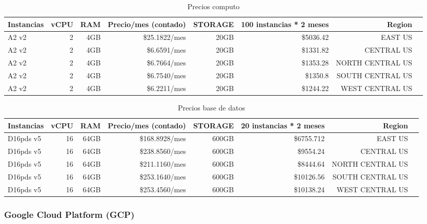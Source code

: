 \documentclass{article}
\begin{document}
  \begin{table}[!htp]\centering
\caption{Precios computo}\label{tab: }
\scriptsize
\begin{tabular}{lrrrrrrr}\toprule
Instancias &vCPU &RAM &Precio/mes (contado) &STORAGE &100 instancias * 2 meses &Region \\\midrule
A2 v2 &2 &4GB &\$25.1822/mes &20GB &\$5036.42 &EAST US \\
A2 v2 &2 &4GB &\$6.6591/mes &20GB &\$1331.82 &CENTRAL US \\
A2 v2 &2 &4GB &\$6.7664/mes &20GB &\$1353.28 &NORTH CENTRAL US \\
A2 v2 &2 &4GB &\$6.7540/mes &20GB &\$1350.8 &SOUTH CENTRAL US \\
A2 v2 &2 &4GB &\$6.2211/mes &20GB &\$1244.22 &WEST CENTRAL US \\
\bottomrule
\end{tabular}
\end{table}

\begin{table}[!htp]\centering
\caption{Precios base de datos}\label{tab: }
\scriptsize
\begin{tabular}{lrrrrrrr}\toprule
Instancias &vCPU &RAM &Precio/mes (contado) &STORAGE &20 instancias * 2 meses &Region \\\midrule
D16pds v5 &16 &64GB &\$168.8928/mes &600GB &\$6755.712 &EAST US \\
D16pds v5 &16 &64GB &\$238.8560/mes &600GB &\$9554.24 &CENTRAL US \\
D16pds v5 &16 &64GB &\$211.1160/mes &600GB &\$8444.64 &NORTH CENTRAL US \\
D16pds v5 &16 &64GB &\$253.1640/mes &600GB &\$10126.56 &SOUTH CENTRAL US \\
D16pds v5 &16 &64GB &\$253.4560/mes &600GB &\$10138.24 &WEST CENTRAL US \\
\bottomrule
\end{tabular}
\end{table}

\newpage

  \subsubsection*{Google Cloud Platform (GCP)}
\end{document}
